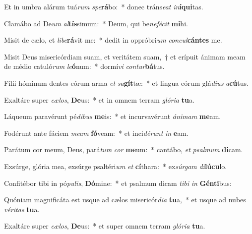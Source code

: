 \item Et in umbra alárum tuá\textit{rum} \textit{spe}\textbf{rá}bo:~* donec tráns\textit{e}\textit{at} \textit{in}\textbf{í}\textbf{qui}tas.
\item Clamábo ad De\textit{um} \textit{al}\textbf{tís}simum:~* Deum, qui be\textit{ne}\textit{fé}\textit{cit} \textbf{mi}hi.
\item Misit de cælo, et \textit{li}\textit{be}\textbf{rá}vit me:~* dedit in oppróbri\textit{um} \textit{con}\textit{cul}\textbf{cán}\textbf{tes} me.
\item Misit Deus misericórdiam suam, et veritátem suam,~† et erípuit ánimam meam de médio catuló\textit{rum} \textit{le}\textbf{ó}num:~* dormí\textit{vi} \textit{con}\textit{tur}\textbf{bá}tus.
\item Fílii hóminum dentes eórum arma \textit{et} \textit{sa}\textbf{gít}tæ:~* et lingua eórum glá\textit{di}\textit{us} \textit{a}\textbf{cú}tus.
\item Exaltáre super \textit{cæ}\textit{los}, \textbf{De}us:~* et in omnem terram \textit{gló}\textit{ri}\textit{a} \textbf{tu}a.
\item Láqueum paravérunt pé\textit{di}\textit{bus} \textbf{me}is:~* et incurvavérunt \textit{á}\textit{ni}\textit{mam} \textbf{me}am.
\item Fodérunt ante fáciem \textit{me}\textit{am} \textbf{fó}veam:~* et inci\textit{dé}\textit{runt} \textit{in} \textbf{e}am.
\item Parátum cor meum, Deus, pará\textit{tum} \textit{cor} \textbf{me}um:~* cantábo, \textit{et} \textit{psal}\textit{mum} \textbf{di}cam.
\item Exsúrge, glória mea, exsúrge psaltéri\textit{um} \textit{et} \textbf{cí}thara:~* ex\textit{súr}\textit{gam} \textit{di}\textbf{lú}\textbf{cu}lo.
\item Confitébor tibi in pó\textit{pu}\textit{lis}, \textbf{Dó}mine:~* et psalmum dicam \textit{ti}\textit{bi} \textit{in} \textbf{Gén}\textbf{ti}bus:
\item Quóniam magnificáta est usque ad cælos misericór\textit{di}\textit{a} \textbf{tu}a,~* et usque ad nubes \textit{vé}\textit{ri}\textit{tas} \textbf{tu}a.
\item Exaltáre super \textit{cæ}\textit{los}, \textbf{De}us:~* et super omnem terram \textit{gló}\textit{ri}\textit{a} \textbf{tu}a.
